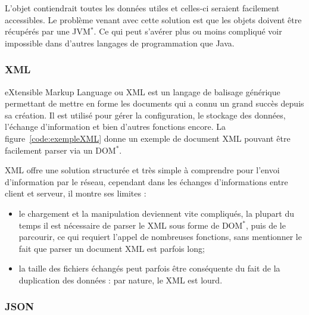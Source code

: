 \vspace{0.20cm}


\label{code:exempleJava}

L'objet contiendrait toutes les donn\'ees utiles et celles-ci seraient facilement accessibles.
Le probl\`eme venant avec cette solution est que les objets doivent \^etre r\'ecup\'er\'es par une JVM$^*$.
Ce qui peut s'av\'erer plus ou moins compliqu\'e voir impossible dans d'autres langages de programmation que Java.

\subsubsection{XML}

eXtensible Markup Language ou XML est un langage de balisage g\'en\'erique permettant de mettre en forme les documents qui a connu un grand succ\`es depuis sa cr\'eation.
Il est utilis\'e pour g\'erer la configuration, le stockage des donn\'ees, l'\'echange d'information et bien d'autres fonctions encore.
La figure~\ref{code:exempleXML} donne un exemple de document XML pouvant \^etre facilement parser via un DOM$^*$.

\vspace{0.20cm}


\label{code:exempleXML}

XML offre une solution structur\'ee et tr\`es simple \`a comprendre pour l'envoi d'information par le r\'eseau, cependant dans les \'echanges d'informations entre client et serveur, il montre ses limites :

\begin{itemize}
	\item le chargement et la manipulation deviennent vite compliqu\'es, la plupart du temps il est n\'ecessaire de parser le XML sous forme de DOM$^*$, puis de le parcourir, ce qui requiert l'appel de nombreuses fonctions, sans mentionner le fait que parser un document XML est parfois long;
	\item la taille des fichiers \'echang\'es peut parfois \^etre cons\'equente du fait de la duplication des donn\'ees : par nature, le XML est lourd.

\end{itemize}

\subsubsection{JSON}

